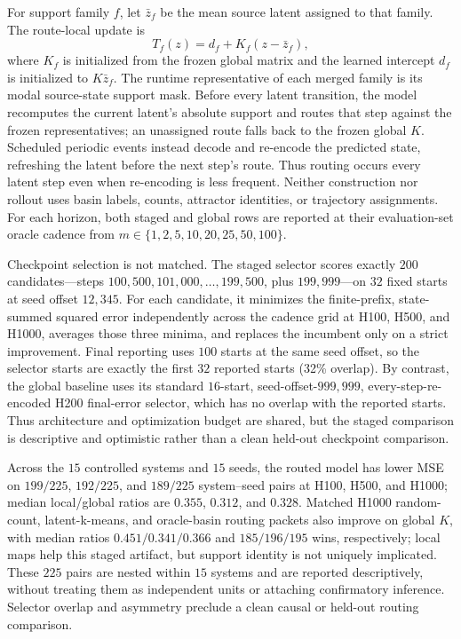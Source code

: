 \documentclass[11pt]{article}
\begin{document}
For support family \(f\), let \(\bar z_f\) be the mean source latent assigned to that family. The route-local update is
\begin{equation}
  T_f(z)=d_f+K_f(z-\bar z_f),
  \label{eq:fabs_local_affine}
\end{equation}
where \(K_f\) is initialized from the frozen global matrix and the learned intercept \(d_f\) is initialized to \(K\bar z_f\). The runtime representative of each merged family is its modal source-state support mask. Before every latent transition, the model recomputes the current latent's absolute support and routes that step against the frozen representatives; an unassigned route falls back to the frozen global \(K\). Scheduled periodic events instead decode and re-encode the predicted state, refreshing the latent before the next step's route. Thus routing occurs every latent step even when re-encoding is less frequent. Neither construction nor rollout uses basin labels, counts, attractor identities, or trajectory assignments. For each horizon, both staged and global rows are reported at their evaluation-set oracle cadence from \(m\in\{1,2,5,10,20,25,50,100\}\).

Checkpoint selection is not matched. The staged selector scores exactly \(200\) candidates---steps \(100{,}500,101{,}000,\ldots,199{,}500\), plus \(199{,}999\)---on \(32\) fixed starts at seed offset \(12{,}345\). For each candidate, it minimizes the finite-prefix, state-summed squared error independently across the cadence grid at H100, H500, and H1000, averages those three minima, and replaces the incumbent only on a strict improvement. Final reporting uses \(100\) starts at the same seed offset, so the selector starts are exactly the first \(32\) reported starts (32\% overlap). By contrast, the global baseline uses its standard \(16\)-start, seed-offset-\(999{,}999\), every-step-re-encoded H200 final-error selector, which has no overlap with the reported starts. Thus architecture and optimization budget are shared, but the staged comparison is descriptive and optimistic rather than a clean held-out checkpoint comparison.

Across the \(15\) controlled systems and \(15\) seeds, the routed model has lower MSE on \(199/225\), \(192/225\), and \(189/225\) system--seed pairs at H100, H500, and H1000; median local/global ratios are \(0.355\), \(0.312\), and \(0.328\). Matched H1000 random-count, latent-k-means, and oracle-basin routing packets also improve on global \(K\), with median ratios \(0.451/0.341/0.366\) and \(185/196/195\) wins, respectively; local maps help this staged artifact, but support identity is not uniquely implicated. These \(225\) pairs are nested within \(15\) systems and are reported descriptively, without treating them as independent units or attaching confirmatory inference. Selector overlap and asymmetry preclude a clean causal or held-out routing comparison.
\end{document}
